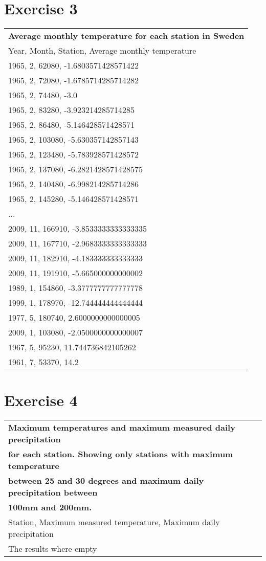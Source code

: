 \documentclass[a4paper,titlepage,12pt]{article}
\begin{document}
\section{Exercise 3}
\begin{tabular}{l}
  \bf Average monthly temperature for each station in Sweden \\ 
  Year, Month, Station, Average monthly temperature \\
  \hline
  1965, 2, 62080, -1.6803571428571422 \\ 
  1965, 2, 72080, -1.6785714285714282 \\ 
  1965, 2, 74480, -3.0                \\
  1965, 2, 83280, -3.923214285714285  \\
  1965, 2, 86480, -5.146428571428571  \\
  1965, 2, 103080, -5.630357142857143 \\
  1965, 2, 123480, -5.783928571428572 \\
  1965, 2, 137080, -6.2821428571428575\\
  1965, 2, 140480, -6.998214285714286 \\
  1965, 2, 145280, -5.146428571428571 \\
  ... \\ 
  2009, 11, 166910, -3.8533333333333335\\
  2009, 11, 167710, -2.9683333333333333\\
  2009, 11, 182910, -4.183333333333333\\
  2009, 11, 191910, -5.665000000000002\\
  1989, 1, 154860, -3.3777777777777778\\
  1999, 1, 178970, -12.744444444444444\\
  1977, 5, 180740, 2.6000000000000005 \\
  2009, 1, 103080, -2.0500000000000007\\
  1967, 5, 95230, 11.744736842105262  \\
  1961, 7, 53370, 14.2                \\
\end{tabular}

\section{Exercise 4}
\begin{tabular}{l}
  \bf Maximum temperatures and maximum measured daily precipitation \\
  \bf for each station. Showing only stations with maximum temperature \\
  \bf between 25 and 30 degrees and maximum daily precipitation between \\
  \bf 100mm and 200mm. \\
  Station, Maximum measured temperature, Maximum daily precipitation \\
  \hline
  The results where empty \\ 
\end{tabular}
\end{document}
